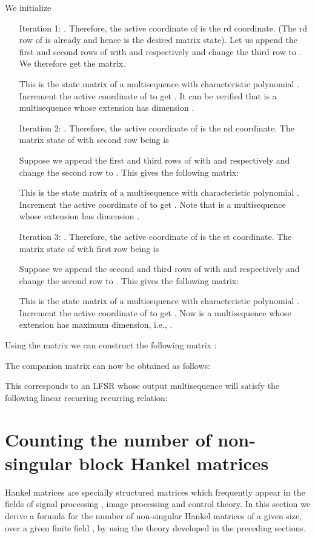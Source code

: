 \documentclass[letterpaper, 12 pt]{article}  \usepackage{amssymb}
\begin{document}
We initialize 
\begin{enumerate}
 \item[Iteration 1:] . Therefore, the active coordinate of 
is the rd coordinate. (The rd row of  is already  and hence
 is the desired matrix state).  
Let us append the first and second rows of  with  and  respectively and
change the third row to . We therefore get the matrix.

  This is the state matrix of a multisequence  with characteristic
polynomial . Increment the active coordinate of  to get . It can be verified that  is a multisequence whose extension has dimension .

 \item[Iteration 2:] . Therefore, the active coordinate of  is
the nd coordinate. The matrix state of  with second row being 
is 

Suppose we append the first and third rows of  with  and  respectively and
change the second row to . This gives the following matrix:
 
 This is the state matrix of a multisequence  with characteristic
polynomial . Increment
the active coordinate of  to get . Note that  is a multisequence whose extension has dimension .

 \item[Iteration 3:] . Therefore, the active coordinate of  is
the st coordinate. The matrix state of  with first row being 
is 

Suppose we append the second and third rows of  with  and  respectively and
change the second row to . This gives the following matrix:
 
 This is the state matrix of a multisequence  with characteristic
polynomial . Increment the active coordinate of  to get . Now  is a multisequence whose extension has maximum
dimension, i.e., .
\end{enumerate}


Using the matrix  we can construct the following matrix 
: 

The companion matrix  can now be obtained as follows:

This corresponds to an LFSR whose output multisequence will satisfy the
following linear recurring recurring relation: 




 \section{Counting the number of non-singular block Hankel matrices}
Hankel matrices are specially structured matrices which frequently
appear in the fields of signal processing \cite{Hasan}, image
processing and control theory. In this section
we derive a formula for the number of non-singular Hankel matrices of a given
size, over a given finite field , by using the theory developed in the
preceding sections. 
\end{document}
